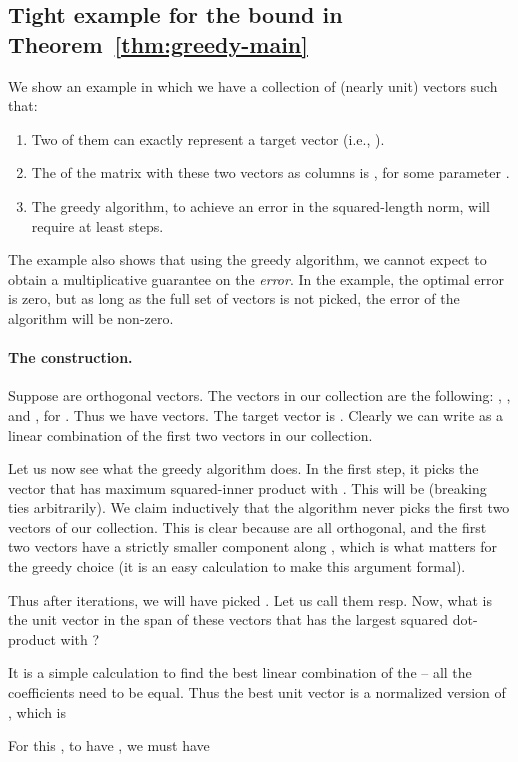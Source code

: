 \documentclass{article}
\newcommand{\enum}[1]{\begin{enumerate} #1 \end{enumerate}}
\begin{document}
\subsection{Tight example for the bound in Theorem~\ref{thm:greedy-main}} \label{app:tight-ex}

We show an example in which we have a collection of (nearly unit)
vectors such that:
\enum{
\item Two of them can exactly represent a target vector
 (i.e., ). 
\item The  of the matrix with these two vectors as
columns is , for some parameter .
\item The greedy algorithm, to achieve an error  in
the squared-length norm, will require at least  steps.
}

The example also shows that using the greedy algorithm, we cannot
expect to obtain a multiplicative guarantee on the {\em error}. In the
example, the optimal error is zero, but as long as the full set of
vectors is not picked, the error of the algorithm will be non-zero.

\paragraph{The construction.} 
Suppose  are orthogonal vectors.  The vectors in
our collection are the following: , , and
, for . Thus we have  vectors. The
target vector  is .  Clearly we can write  as a linear
combination of the first two vectors in our collection.

Let us now see what the greedy algorithm does. In the first step, it
picks the vector that has maximum squared-inner product with .
This will be  (breaking ties arbitrarily). We claim
inductively that the algorithm never picks the first two vectors of
our collection. This is clear because  are all
orthogonal, and the first two vectors have a strictly smaller
component along , which is what matters for the greedy choice (it
is an easy calculation to make this argument formal).

Thus after  iterations, we will have picked .  Let us call them
 resp. Now, what is the unit vector in the span
of these vectors that has the largest squared dot-product with ?

It is a simple calculation to find the best linear combination of the
 -- all the coefficients need to be equal. Thus the best unit
vector is a normalized version of , which is


For this , to have , we must have 
\end{document}
